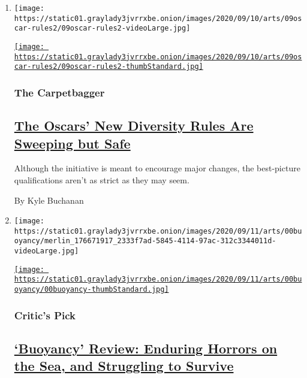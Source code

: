 \begin{enumerate}
\def\labelenumi{\arabic{enumi}.}
\item
  \texttt{[image: https://static01.graylady3jvrrxbe.onion/images/2020/09/10/arts/09oscar-rules2/09oscar-rules2-videoLarge.jpg]}

  \href{/2020/09/09/movies/oscars-best-picture-diversity.html}{\texttt{[image: https://static01.graylady3jvrrxbe.onion/images/2020/09/10/arts/09oscar-rules2/09oscar-rules2-thumbStandard.jpg]}}

  \hypertarget{the-carpetbagger}{%
  \subsubsection{The Carpetbagger}\label{the-carpetbagger}}

  \hypertarget{the-oscars-new-diversity-rules-are-sweeping-but-safe}{%
  \subsection{\texorpdfstring{\href{/2020/09/09/movies/oscars-best-picture-diversity.html}{The
  Oscars' New Diversity Rules Are Sweeping but
  Safe}}{The Oscars' New Diversity Rules Are Sweeping but Safe}}\label{the-oscars-new-diversity-rules-are-sweeping-but-safe}}

  Although the initiative is meant to encourage major changes, the
  best-picture qualifications aren't as strict as they may seem.

  By Kyle Buchanan
\item
  \texttt{[image: https://static01.graylady3jvrrxbe.onion/images/2020/09/11/arts/00buoyancy/merlin\_176671917\_2333f7ad-5845-4114-97ac-312c3344011d-videoLarge.jpg]}

  \href{/2020/09/10/movies/buoyancy-review.html}{\texttt{[image: https://static01.graylady3jvrrxbe.onion/images/2020/09/11/arts/00buoyancy/00buoyancy-thumbStandard.jpg]}}

  \hypertarget{critics-pick}{%
  \subsubsection{Critic's Pick}\label{critics-pick}}

  \hypertarget{buoyancy-review-enduring-horrors-on-the-sea-and-struggling-to-survive}{%
  \subsection{\texorpdfstring{\href{/2020/09/10/movies/buoyancy-review.html}{`Buoyancy'
  Review: Enduring Horrors on the Sea, and Struggling to
  Survive}}{`Buoyancy' Review: Enduring Horrors on the Sea, and Struggling to Survive}}\label{buoyancy-review-enduring-horrors-on-the-sea-and-struggling-to-survive}}


\end{enumerate}
